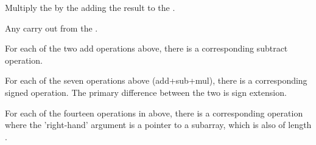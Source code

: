 \begin{addedblock}
\begin{itemdescr}

\effects Multiply the  by the  adding the result to the .

\returns Any carry out from the .
\end{itemdescr}

For each of the two add operations above, there is a corresponding subtract operation.

For each of the seven operations above (add+sub+mul), there is a corresponding signed operation. The primary difference between the two is sign extension.

For each of the fourteen operations in above, there is a corresponding operation where the 'right-hand' argument is a pointer to a subarray, which is also of length .
\end{addedblock}
